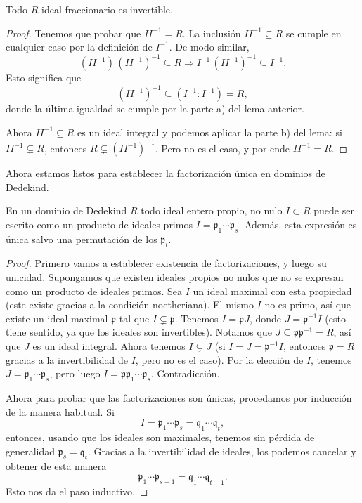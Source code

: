 \begin{lema}
  Todo $R$-ideal fraccionario es invertible.

  \begin{proof}
    Tenemos que probar que $I I^{-1} = R$. La inclusión
    $I I^{-1} \subseteq R$ se cumple en cualquier caso por la definición
    de $I^{-1}$. De modo similar,
    \[ (I I^{-1})\,(I I^{-1})^{-1} \subseteq R \Longrightarrow
           I^{-1}\,(I I^{-1})^{-1} \subseteq I^{-1}. \]
    Esto significa que
    $$(I I^{-1})^{-1} \subseteq (I^{-1} : I^{-1}) = R,$$
    donde la última igualdad se cumple por la parte a) del lema anterior.

    Ahora $I I^{-1} \subseteq R$ es un ideal integral y podemos aplicar la parte
    b) del lema: si $I I^{-1} \subsetneq R$, entonces
    $R \subsetneq (I I^{-1})^{-1}$. Pero no es el caso, y por ende $I I^{-1} = R$.
  \end{proof}
\end{lema}

Ahora estamos listos para establecer la factorización única en dominios
de Dedekind.

\begin{teorema}
  En un dominio de Dedekind $R$ todo ideal entero propio, no nulo $I \subset R$
  puede ser escrito como un producto de ideales primos
  $I = \mathfrak{p}_1\cdots\mathfrak{p}_s$. Además, esta expresión es única
  salvo una permutación de los $\mathfrak{p}_i$.

  \begin{proof}
    Primero vamos a establecer existencia de factorizaciones, y luego su
    unicidad. Supongamos que existen ideales propios no nulos que no se expresan
    como un producto de ideales primos. Sea $I$ un ideal maximal con esta
    propiedad (este existe gracias a la condición noetheriana). El mismo $I$
    no es primo, así que existe un ideal maximal $\mathfrak{p}$ tal que
    $I \subsetneq \mathfrak{p}$. Tenemos $I = \mathfrak{p} J$, donde
    $J = \mathfrak{p}^{-1} I$ (esto tiene sentido, ya que los ideales son
    invertibles). Notamos que $J \subseteq \mathfrak{p} \mathfrak{p}^{-1} = R$,
    así que $J$ es un ideal integral. Ahora tenemos $I \subsetneq J$
    (si $I = J = \mathfrak{p}^{-1} I$, entonces $\mathfrak{p} = R$
    gracias a la invertibilidad de $I$, pero no es el caso). Por la elección
    de $I$, tenemos $J = \mathfrak{p}_1\cdots\mathfrak{p}_s$, pero luego
    $I = \mathfrak{p}\mathfrak{p}_1\cdots\mathfrak{p}_s$. Contradicción.

    Ahora para probar que las factorizaciones son únicas, procedamos por
    inducción de la manera habitual. Si
    \[ I = \mathfrak{p}_1\cdots\mathfrak{p}_s =
           \mathfrak{q}_1\cdots\mathfrak{q}_t, \]
    entonces, usando que los ideales son maximales, tenemos sin pérdida de
    generalidad $\mathfrak{p}_s = \mathfrak{q}_t$. Gracias a la invertibilidad
    de ideales, los podemos cancelar y obtener de esta manera
    \[ \mathfrak{p}_1\cdots\mathfrak{p}_{s-1} =
       \mathfrak{q}_1\cdots\mathfrak{q}_{t-1}. \]
    Esto nos da el paso inductivo.
  \end{proof}
\end{teorema}


